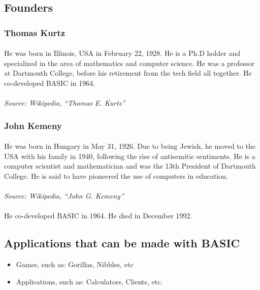 \documentclass{article}
\begin{document}
	\subsection*{Founders}
	\subsubsection*{Thomas Kurtz}
	\paragraph{}He was born in Illinois, USA in February 22, 1928.
	He is a Ph.D holder and specialized in the area of mathematics and computer science.
	He was a professor at Dartmouth College, before his retirement from the tech field all together.
	He co-developed BASIC in 1964.
	\paragraph{}\textit{Source: Wikipedia, “Thomas E. Kurtz”}
	\subsubsection*{John Kemeny}
	\paragraph{}He was born in Hungary in May 31, 1926.
	Due to being Jewish, he moved to the USA with his family in 1940, following the rise of antisemitic sentiments.
	He is a computer scientist and mathematician and was the 13th President of Dartmouth College.
	He is said to have pioneered the use of computers in education.
	\paragraph{}\textit{Source: Wikipedia, “John G. Kemeny”}
	\paragraph{}He co-developed BASIC in 1964.
	He died in December 1992.
	\subsection*{Applications that can be made with BASIC}
	\begin{itemize}
		\item Games, such as: Gorillas, Nibbles, etc
		\item Applications, such as: Calculators, Clients, etc.
	\end{itemize}
\end{document}
